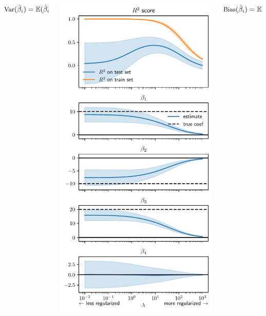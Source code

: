 \documentclass[presentation,mathserif,table]{beamer}
\begin{document}
\begin{frame}[label={sec:orgaa30031}]{}
\begin{columns}
\begin{column}{.33\columnwidth}
\(\small{ \text{Var}(\hat{\beta}_i) = \mathbb{E}(\hat{\beta}_i  - \mathbb{E}(\hat{\beta}_i))^2}\)
\end{column}

\begin{column}{.38\columnwidth}
\begin{center}
\includegraphics[height=\textheight]{ridge_regularization_path.pdf}
\end{center}
\end{column}
\begin{column}{.3\columnwidth}
\(\small \text{Bias}(\hat{\beta}_i) = \mathbb{E}(\hat{\beta}_i) - \beta_i\)
\end{column}
\end{columns}
\end{frame}
\end{document}
